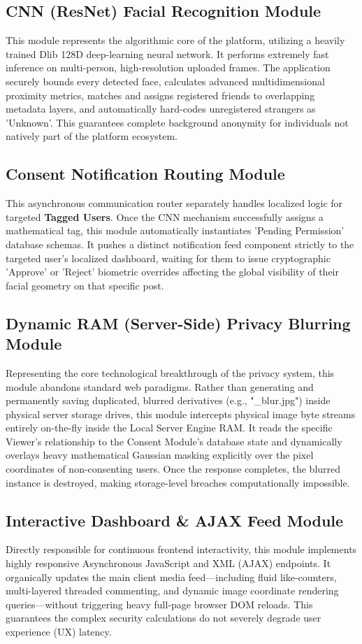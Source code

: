 \subsection{CNN (ResNet) Facial Recognition Module}
This module represents the algorithmic core of the platform, utilizing a heavily trained Dlib 128D deep-learning neural network. It performs extremely fast inference on multi-person, high-resolution uploaded frames. The application securely bounds every detected face, calculates advanced multidimensional proximity metrics, matches and assigns registered friends to overlapping metadata layers, and automatically hard-codes unregistered strangers as 'Unknown'. This guarantees complete background anonymity for individuals not natively part of the platform ecosystem.

\subsection{Consent Notification Routing Module}
This asynchronous communication router separately handles localized logic for targeted \textbf{Tagged Users}. Once the CNN mechanism successfully assigns a mathematical tag, this module automatically instantiates 'Pending Permission' database schemas. It pushes a distinct notification feed component strictly to the targeted user's localized dashboard, waiting for them to issue cryptographic 'Approve' or 'Reject' biometric overrides affecting the global visibility of their facial geometry on that specific post.

\subsection{Dynamic RAM (Server-Side) Privacy Blurring Module}
Representing the core technological breakthrough of the privacy system, this module abandons standard web paradigms. Rather than generating and permanently saving duplicated, blurred derivatives (e.g., "\_blur.jpg") inside physical server storage drives, this module intercepts physical image byte streams entirely on-the-fly inside the Local Server Engine RAM. It reads the specific Viewer's relationship to the Consent Module's database state and dynamically overlays heavy mathematical Gaussian masking explicitly over the pixel coordinates of non-consenting users. Once the response completes, the blurred instance is destroyed, making storage-level breaches computationally impossible.

\subsection{Interactive Dashboard \& AJAX Feed Module}
Directly responsible for continuous frontend interactivity, this module implements highly responsive Asynchronous JavaScript and XML (AJAX) endpoints. It organically updates the main client media feed—including fluid like-counters, multi-layered threaded commenting, and dynamic image coordinate rendering queries—without triggering heavy full-page browser DOM reloads. This guarantees the complex security calculations do not severely degrade user experience (UX) latency.

